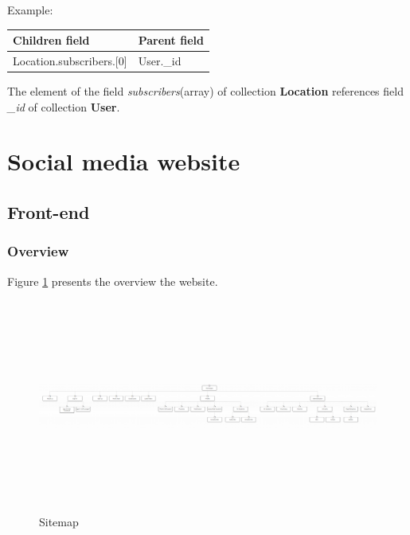 \cleardoublepage
Example:
\begin{table}[H]
\begin{tabular}{|l|l|}
\hline
Children field               & Parent field \\ \hline
Location.subscribers.{[}0{]} & User.\_id    \\ \hline
\end{tabular}
\end{table}
The element of the field \textit{subscribers}(array) of collection \textbf{Location} references field \textit{\_id} of collection \textbf{User}.
\section{Social media website}
\subsection{Front-end}
\subsubsection{Overview}
Figure \ref{chap4:sitemap} presents the overview the website.
\begin{center}
    \begin{figure}[H]
    \centering
    \includegraphics[width=1.5\columnwidth,height=7cm,angle=270]{images/chap4/sitemap.png}
    \caption{Sitemap}
    \label{chap4:sitemap}
    \end{figure}
\end{center}
